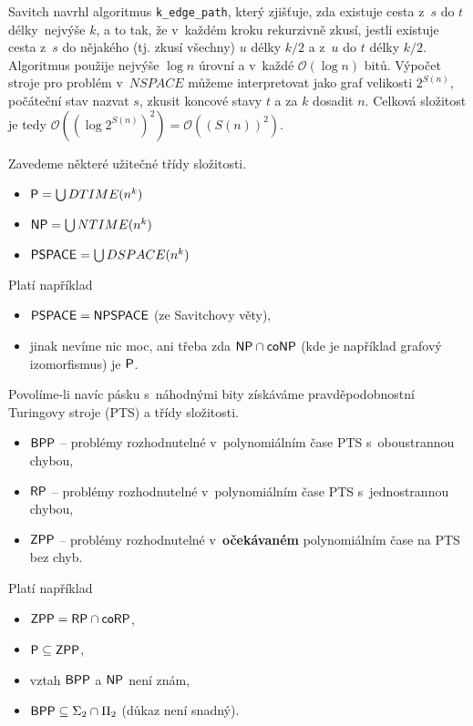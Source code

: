 Savitch navrhl algoritmus \verb|k_edge_path|,
který zjišťuje, zda existuje cesta z~$s$ do $t$ délky~nejvýše $k$, a to
tak, že v~každém kroku rekurzivně zkusí, jestli existuje cesta z~$s$ do
nějakého (tj. zkusí všechny) $u$ délky $k/2$ a z~$u$ do $t$ délky $k/2$.
Algoritmus použije nejvýše $\log n$ úrovní a v~každé
$\mathcal{O}(\log n)$ bitů.
Výpočet stroje pro problém v~$NSPACE$ můžeme interpretovat jako graf
velikosti $2^{S(n)}$, počáteční stav nazvat $s$, zkusit koncové stavy
$t$ a za $k$ dosadit $n$. Celková složitost je tedy
$\mathcal{O}((\log 2^{S(n)})^2) = \mathcal{O}((S(n))^2)$.

Zavedeme některé užitečné třídy složitosti.

\begin{itemize}
    \item $\P = \bigcup DTIME(n^k)$
    \item $\NP = \bigcup NTIME(n^k)$
    \item $\PSPACE = \bigcup DSPACE(n^k)$
\end{itemize}
Platí například
\begin{itemize}
    \item $\PSPACE = \NPSPACE$ (ze Savitchovy věty),
    \item jinak nevíme nic moc, ani třeba zda $\NP \cap \coNP$ (kde je
        například grafový izomorfismus) je $\P$.
\end{itemize}

Povolíme-li navíc pásku s~náhodnými bity získáváme pravděpodobnostní
Turingovy stroje (PTS) a třídy složitosti.

\begin{itemize}
    \item $\BPP$ -- problémy rozhodnutelné v~polynomiálním čase PTS s~oboustrannou chybou,
    \item $\RP$ -- problémy rozhodnutelné v~polynomiálním čase PTS s~jednostrannou chybou,
    \item $\ZPP$ -- problémy rozhodnutelné v~{\bf očekávaném}
        polynomiálním čase na PTS bez chyb.
\end{itemize}
Platí například
\begin{itemize}
    \item $\ZPP = \RP \cap \coRP$,
    \item $\P \subseteq \ZPP$,
    \item vztah $\BPP$ a $\NP$ není znám,
    \item $\BPP \subseteq \Sigma_2 \cap \Pi_2$ (důkaz není snadný).
\end{itemize}

